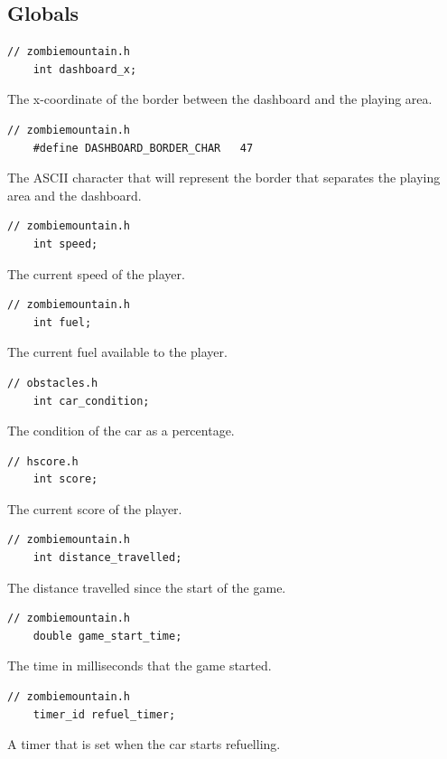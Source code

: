 \documentclass{article}
\begin{document}
\subsection*{Globals}
\begin{lstlisting}[style=CStyle]
	// zombiemountain.h
	int dashboard_x;
\end{lstlisting}
The x-coordinate of the border between the dashboard and the playing area.
\begin{lstlisting}[style=CStyle]
	// zombiemountain.h
	#define DASHBOARD_BORDER_CHAR	47
\end{lstlisting}
The ASCII character that will represent the border that separates the playing area and the dashboard.
\begin{lstlisting}[style=CStyle]
	// zombiemountain.h
	int speed;
\end{lstlisting}
The current speed of the player.
\begin{lstlisting}[style=CStyle]
	// zombiemountain.h
	int fuel;
\end{lstlisting}
The current fuel available to the player.
\begin{lstlisting}[style=CStyle]
	// obstacles.h
	int car_condition;
\end{lstlisting}
The condition of the car as a percentage.
\begin{lstlisting}[style=CStyle]
	// hscore.h
	int score;
\end{lstlisting}
The current score of the player.
\begin{lstlisting}[style=CStyle]
	// zombiemountain.h
	int distance_travelled;
\end{lstlisting}
The distance travelled since the start of the game.
\begin{lstlisting}[style=CStyle]
	// zombiemountain.h
	double game_start_time;
\end{lstlisting}
The time in milliseconds that the game started.
\begin{lstlisting}[style=CStyle]
	// zombiemountain.h
	timer_id refuel_timer;
\end{lstlisting}
A timer that is set when the car starts refuelling.
\newline
\end{document}
